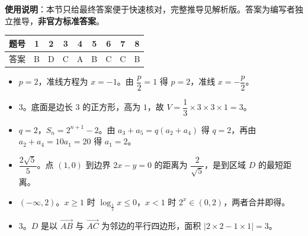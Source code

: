 
\begin{gknotice}
\textbf{使用说明}：本节只给最终答案便于快速核对，完整推导见解析版。答案为编写者独立推导，\textbf{非官方标准答案}。
\end{gknotice}

\begin{center}\begin{tabular}{ccccccccc}
\toprule
题号 & 1 & 2 & 3 & 4 & 5 & 6 & 7 & 8 \\
\midrule
答案 & B & D & C & A & B & C & C & B \\
\bottomrule
\end{tabular}\end{center}

\begin{itemize}[leftmargin=2.6em]
  \item[\textbf{9.}] $p=2$，准线方程为 $x=-1$。由 $\dfrac p2=1$ 得 $p=2$，准线 $x=-\dfrac p2$。
  \item[\textbf{10.}] $3$。底面是边长 $3$ 的正方形，高为 $1$，故 $V=\dfrac13\times3\times3\times1=3$。
  \item[\textbf{11.}] $q=2$，$S_n=2^{n+1}-2$。由 $a_3+a_5=q(a_2+a_4)$ 得 $q=2$，再由 $a_2+a_4=10a_1=20$ 得 $a_1=2$。
  \item[\textbf{12.}] $\dfrac{2\sqrt5}5$。点 $(1,0)$ 到边界 $2x-y=0$ 的距离为 $\dfrac2{\sqrt5}$，是到区域 $D$ 的最短距离。
  \item[\textbf{13.}] $(-\infty,2)$。$x\geqslant1$ 时 $\log_{\frac12}x\leqslant0$，$x<1$ 时 $2^x\in(0,2)$，两者合并即得。
  \item[\textbf{14.}] $3$。$D$ 是以 $\overrightarrow{AB}$ 与 $\overrightarrow{AC}$ 为邻边的平行四边形，面积 $\left|2\times2-1\times1\right|=3$。
\end{itemize}

